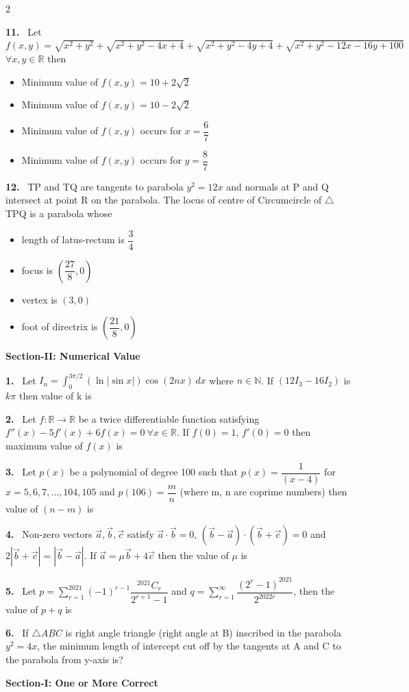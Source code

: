 \documentclass[10pt]{extarticle}
\newcommand{\papersec}[1]{\par\bigskip{\centering\Large\bfseries PAPER-#1\par}\medskip}
\newcommand{\partsec}[2]{\par\medskip\noindent{\large\bfseries PART-#1: #2}\par\smallskip}
\newcommand{\sect}[1]{\par\smallskip\noindent\textbf{#1}\par}
\newcommand{\qn}[1]{\par\smallskip\noindent\textbf{#1.}~}
\newenvironment{qoptions}{\begin{itemize}[leftmargin=1.8em,itemsep=1pt,topsep=2pt,label={}]}{\end{itemize}}
\newcommand{\opt}[2]{\item[(#1)] #2}
\begin{document}
\begin{multicols}{2}
\qn{11} Let $f(x,y) = \sqrt{x^2+y^2} + \sqrt{x^2+y^2-4x+4} + \sqrt{x^2+y^2-4y+4} + \sqrt{x^2+y^2-12x-16y+100}$ $\forall x,y\in\mathbb{R}$ then
\begin{qoptions}
\opt{A}{Minimum value of $f(x,y) = 10 + 2\sqrt{2}$}
\opt{B}{Minimum value of $f(x,y) = 10 - 2\sqrt{2}$}
\opt{C}{Minimum value of $f(x,y)$ occurs for $x = \dfrac{6}{7}$}
\opt{D}{Minimum value of $f(x,y)$ occurs for $y = \dfrac{8}{7}$}
\end{qoptions}

\qn{12} TP and TQ are tangents to parabola $y^2 = 12x$ and normals at P and Q intersect at point R on the parabola. The locus of centre of Circumcircle of $\triangle$TPQ is a parabola whose
\begin{qoptions}
\opt{A}{length of latus-rectum is $\dfrac{3}{4}$}
\opt{B}{focus is $\left(\dfrac{27}{8},0\right)$}
\opt{C}{vertex is $(3,0)$}
\opt{D}{foot of directrix is $\left(\dfrac{21}{8},0\right)$}
\end{qoptions}

\sect{Section-II: Numerical Value}

\qn{1} Let $I_n = \displaystyle\int_0^{3\pi/2} (\ln|\sin x|)\cos(2nx)\,dx$ where $n\in\mathbb{N}$. If $(12I_3 - 16I_2)$ is $k\pi$ then value of k is

\qn{2} Let $f:\mathbb{R}\to\mathbb{R}$ be a twice differentiable function satisfying $f''(x) - 5f'(x) + 6f(x) = 0\ \forall x\in\mathbb{R}$. If $f(0) = 1$, $f'(0) = 0$ then maximum value of $f(x)$ is

\qn{3} Let $p(x)$ be a polynomial of degree 100 such that $p(x) = \dfrac{1}{(x-4)}$ for $x = 5,6,7,\ldots,104,105$ and $p(106) = \dfrac{m}{n}$ (where m, n are coprime numbers) then value of $(n-m)$ is

\qn{4} Non-zero vectors $\vec a, \vec b, \vec c$ satisfy $\vec a\cdot\vec b = 0$, $(\vec b - \vec a)\cdot(\vec b + \vec c) = 0$ and $2|\vec b+\vec c| = |\vec b - \vec a|$. If $\vec a = \mu\vec b + 4\vec c$ then the value of $\mu$ is

\qn{5} Let $p = \displaystyle\sum_{r=1}^{2021}(-1)^{r-1}\dfrac{{}^{2021}C_r}{2^{r+1}-1}$ and $q = \displaystyle\sum_{r=1}^{\infty}\dfrac{(2^r-1)^{2021}}{2^{2022r}}$, then the value of $p+q$ is

\qn{6} If $\triangle ABC$ is right angle triangle (right angle at B) inscribed in the parabola $y^2 = 4x$, the minimum length of intercept cut off by the tangents at A and C to the parabola from y-axis is?

\papersec{2}
\partsec{1}{PHYSICS}
\sect{Section-I: One or More Correct}


\end{multicols}
\end{document}
